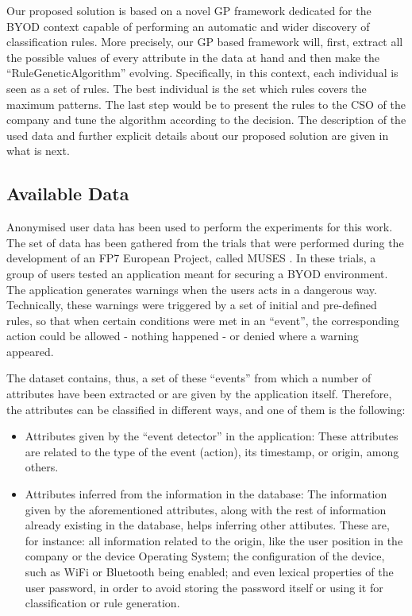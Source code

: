 \documentclass[a4paper,10pt,twocolumn,preprint,3p]{elsarticle}
\begin{document}
Our proposed solution is based on a novel GP framework dedicated for the BYOD context capable of performing an automatic and wider discovery of classification rules. More precisely, our GP based framework will, first, extract all the possible values of every attribute in the data at hand and then make the ``RuleGeneticAlgorithm'' evolving. Specifically, in this context, each individual is seen as a set of rules. The best individual is the set which rules covers the maximum patterns. The last step would be to present the rules to the CSO of the company and tune the algorithm according to the decision. The description of the used data and further explicit details about our proposed solution are given in what is next.

\subsection{Available Data}
\label{subsec:data}

Anonymised user data has been used to perform the experiments for this work. The set of data has been gathered from the trials that were performed during the development of an FP7 European Project, called MUSES \cite{DBLP:conf/sac/MoraCGZJEBAH14}. In these trials, a group of users tested an application meant for securing a BYOD environment. The application generates warnings when the users acts in a dangerous way. Technically, these warnings were triggered by a set of initial and pre-defined rules, so that when certain conditions were met in an ``event'', the corresponding action could be allowed - nothing happened - or denied where a warning appeared.

The dataset contains, thus, a set of these ``events'' from which a number of attributes have been extracted or are given by the application itself. Therefore, the attributes can be classified in different ways, and one of them is the following:
\begin{itemize}
  \item Attributes given by the ``event detector'' in the application: These attributes are related to the type of the event (action), its timestamp, or origin, among others.
  \item Attributes inferred from the information in the database: The information given by the aforementioned attributes, along with the rest of information already existing in the database, helps inferring other attibutes.
       These are, for instance: all information related to the origin, like the user position in the company or the device Operating System; the configuration of the device, such as WiFi or Bluetooth being enabled; and even lexical properties of the user password, in order to avoid storing the password itself or using it for classification or rule generation.
\end{itemize}
\end{document}
